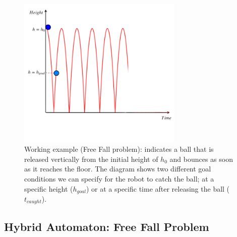 \begin{figure}[!ht]
\centering
\includegraphics[width=0.7\textwidth]{diagrams/FreeFall3.png}
\caption{Working example (Free Fall problem): indicates a ball that is released vertically from the initial height of $h_0$ and bounces as soon as it reaches the floor. The diagram shows two different goal conditions we can specify for the robot to catch the ball; at a specific height ($h_{goal}$) or at a specific time after releasing the ball ($t_{caught}$).}
\label{fig:Freefall}
\end{figure}




\subsection{Hybrid Automaton: Free Fall Problem}

